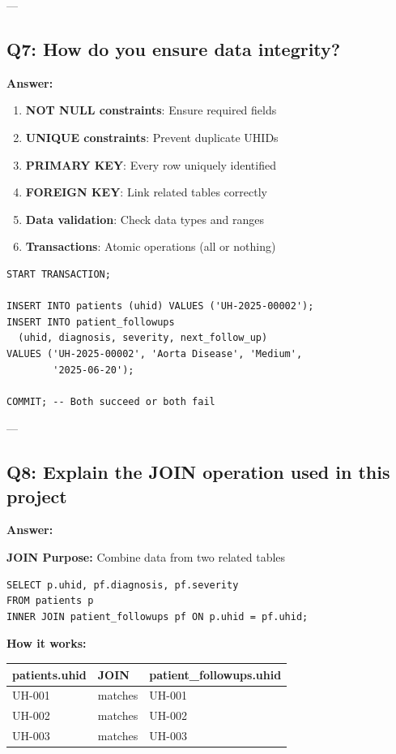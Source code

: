 \documentclass[12pt,a4paper]{article}
\begin{document}
---

\subsection{Q7: How do you ensure data integrity?}

\textbf{Answer:}

\begin{enumerate}
    \item \textbf{NOT NULL constraints}: Ensure required fields
    \item \textbf{UNIQUE constraints}: Prevent duplicate UHIDs
    \item \textbf{PRIMARY KEY}: Every row uniquely identified
    \item \textbf{FOREIGN KEY}: Link related tables correctly
    \item \textbf{Data validation}: Check data types and ranges
    \item \textbf{Transactions}: Atomic operations (all or nothing)
\end{enumerate}

\begin{lstlisting}[caption={Example: Transaction}]
START TRANSACTION;

INSERT INTO patients (uhid) VALUES ('UH-2025-00002');
INSERT INTO patient_followups 
  (uhid, diagnosis, severity, next_follow_up)
VALUES ('UH-2025-00002', 'Aorta Disease', 'Medium', 
        '2025-06-20');

COMMIT; -- Both succeed or both fail
\end{lstlisting}

---

\subsection{Q8: Explain the JOIN operation used in this project}

\textbf{Answer:}

\textbf{JOIN Purpose:} Combine data from two related tables

\begin{lstlisting}[caption={JOIN Example}]
SELECT p.uhid, pf.diagnosis, pf.severity
FROM patients p
INNER JOIN patient_followups pf ON p.uhid = pf.uhid;
\end{lstlisting}

\textbf{How it works:}
\begin{table}[h]
\centering
\begin{tabular}{|l|l|l|}
\hline
\textbf{patients.uhid} & \textbf{JOIN} & \textbf{patient\_followups.uhid} \\
\hline
UH-001 & matches & UH-001 \\
UH-002 & matches & UH-002 \\
UH-003 & matches & UH-003 \\
\hline
\end{tabular}
\end{table}
\end{document}
